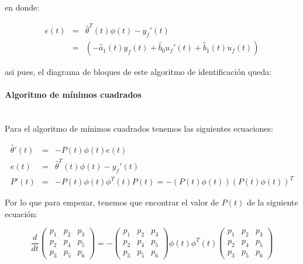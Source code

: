                 en donde:

                \begin{eqnarray}
                    e(t) & = & \hat{\theta}^T(t) \phi(t) - y_f'(t) \\
                    & = & \left( -\hat{a}_1(t) y_f(t) + \hat{b}_0 u_f'(t) + \hat{b}_1(t) u_f(t) \right)
                \end{eqnarray}

                asi pues, el diagrama de bloques de este algoritmo de identificación queda:


            \paragraph{Algoritmo de mínimos cuadrados}\mbox{}\\

                Para el algoritmo de mínimos cuadrados tenemos las siguientes ecuaciones:

                \begin{eqnarray}
                    \hat{\theta}'(t) & = & - P(t) \phi(t) e(t) \\
                    e(t) & = & \hat{\theta}^T(t) \phi(t) - y_f'(t) \\
                    P'(t) & = & - P(t) \phi(t) \phi^T(t) P(t) = - \left( P(t) \phi(t) \right) \left( P(t) \phi(t) \right)^T
                \end{eqnarray}

                Por lo que para empezar, tenemos que encontrar el valor de $P(t)$ de la siguiente ecuación:

                \begin{equation*}
                    \frac{d}{dt}
                    \begin{pmatrix}
                        p_1 & p_2 & p_3 \\
                        p_2 & p_4 & p_5 \\
                        p_3 & p_5 & p_6
                    \end{pmatrix} = -
                    \begin{pmatrix}
                        p_1 & p_2 & p_3 \\
                        p_2 & p_4 & p_5 \\
                        p_3 & p_5 & p_6
                    \end{pmatrix} \phi(t) \phi^T(t)
                    \begin{pmatrix}
                        p_1 & p_2 & p_3 \\
                        p_2 & p_4 & p_5 \\
                        p_3 & p_5 & p_6
                    \end{pmatrix}
                \end{equation*}

